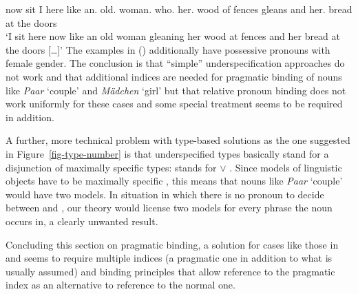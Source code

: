 \documentclass[output=paper
	        ,collection
	        ,collectionchapter
 	        ,biblatex
                ,babelshorthands
                ,newtxmath
                ,draftmode
                ,colorlinks, citecolor=brown
]{langscibook}
\begin{document}
     now sit  I here    like an.\neu{} old.\neu{} woman.\neu{} who.\neu{} her.\fem{} wood of fences gleans and her.\fem{} bread at the doors\\
\label{bsp-goethe-altes-weib}
\glt `I sit here now like an old woman gleaning her wood at fences and her bread at the doors [\ldots]'
\zl
The examples in () additionally have possessive pronouns with female gender. The conclusion is
that ``simple'' underspecification approaches do not work and that additional indices are needed for
pragmatic binding of nouns like \emph{Paar} `couple' and \emph{Mädchen} `girl' but that relative
pronoun binding does not work uniformly for these cases and some special treatment seems to be
required in addition.

A further, more technical problem with type-based solutions as the one suggested in Figure~\ref{fig-type-number} is
that underspecified types basically stand for a disjunction of maximally specific types: 
stands for  $\vee$ . Since models of linguistic objects have to be
maximally specific , this means that nouns like \emph{Paar} `couple' would have two models. In
situation in which there is no pronoun to decide between  and , our
theory would license two models for every phrase the noun occurs in, a clearly unwanted result.

Concluding this section on pragmatic binding, a solution for cases like those in  and
 seems to require multiple indices (a pragmatic one in addition to what is usually
assumed) and binding principles that allow reference to the pragmatic index as an alternative to
reference to the normal one.
\fi 
\end{document}
